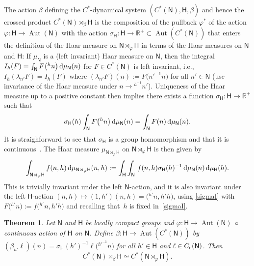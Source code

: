 \documentclass[10pt,a4paper]{amsart}
\numberwithin{equation}{section}
\def\dd{{\rm d}}
\newcommand{\sfH}{\mathsf{H}}
\newcommand{\sfN}{\mathsf{N}}
\newcommand{\Aut}{\operatorname{Aut}}
\newcommand{\real}{{\mathbb R}} %
\newtheorem{Theorem}{Theorem}[section]
\begin{document}
The action $\beta$
defining the $C^*$-dynamical system $(C^*(\sfN ),\sfH ,\beta)$ and hence the crossed
product $C^*(\sfN )\rtimes_\beta \sfH $ is the composition
of the pullback $\varphi^*$ of the action $\varphi\colon \sfH \to \Aut(\sfN )$ with
the action $\sigma_\sfH\colon \sfH \to \real^+\subset \Aut(C^*(\sfN ))$ that enters the
definition of the Haar measure on $\sfN \rtimes_\varphi \sfH $ in terms of the Haar
measures on $\sfN $ and $\sfH $: If $\mu_\sfN $ is a (left invariant)
Haar measure on $\sfN $, then the integral
$I_h(F)=\int_\sfN F\big({}^hn\big)\, \dd\mu_\sfN (n)$ for $F\in C^*(\sfN )$
is left invariant, i.e.,
$I_h(\lambda_{n'}F)= I_h(F)$ where $(\lambda_{n'}F)(n):=F\big(n'^{-1} n\big)$
for all $n'\in \sfN $
(use invariance of the Haar measure under $n\to {}^{h^{-1\!}}n'$).
Uniqueness of the Haar measure up to a positive constant then
implies there exists a function $\sigma_\sfH\colon \sfH\to\real^+$ such that
\begin{gather}\label{sigmaI}
\sigma_\sfH(h) \int_\sfN F\big({}^hn\big) \, \dd\mu_\sfN (n)=\int_\sfN F(n)
\, \dd\mu_\sfN (n) .
\end{gather}
It is straighforward to see that
$\sigma_\sfH$ is a group homomorphism and that it is
continuous~\cite[Section~2]{Williams2007}. The Haar measure
$\mu_{\sfN\rtimes_\varphi\sfH}$ on
$\sfN \rtimes_\varphi \sfH $ is then given by
\[
\int_{\sfN\rtimes_\varphi\sfH} f(n,h) \,
\dd\mu_{\sfN\rtimes_\varphi\sfH}(n,h) := \int_\sfH \int_\sfN\,
f(n,h) \sigma_\sfH(h)^{-1} \, \dd\mu_\sfN (n) \, \dd\mu_\sfH (h) .
\]
This is trivially invariant under the left $\sfN $-action, and
it is also invariant under the left $\sfH $-action $(n,h)\mapsto
(1,h') (n,h)=\big({}^{h'\!}n, h' h\big)$, using \eqref{sigmaI} with $F\big({}^{h'\!}n\big) :=f\big({}^{h'\!}n, h' h\big)$
and recalling that~$h$ is fixed in~\eqref{sigmaI}.

\begin{Theorem}\label{cpsp2}
Let $\sfN $ and $\sfH $ be locally compact groups
 and $\varphi \colon \sfH \to \Aut(\sfN )$ a continuous action of $\sfH $ on $\sfN $. Define
$\beta\colon \sfH \to \Aut(C^*(\sfN ))$ by $(\beta_{h'}\ell)
(n)=\sigma_\sfH(h')^{-1} \ell\big({}^{h'^{-1\!}}n\big)$ for all $h'\in \sfH $ and
$\ell\in C_{\rm c}(\sfN )$. Then
\[
C^*(\sfN )\rtimes_{\beta}\sfH \simeq C^*(\sfN \rtimes_\varphi
\sfH ) .
\]
\end{Theorem}
\end{document}

